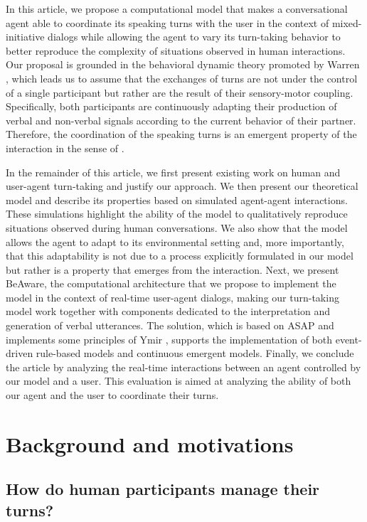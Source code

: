 \documentclass[twocolumn]{svjour3}
\begin{document}
In this article, we propose a computational model that makes a conversational agent able to coordinate its speaking turns with the user in the context of mixed-initiative dialogs while allowing the agent to vary its turn-taking behavior to better reproduce the complexity of situations observed in human interactions. 
Our proposal is grounded in the behavioral dynamic theory promoted by Warren \cite{warren_dynamics_2006}, which leads us to assume that the exchanges of turns are not under the control of a single participant but rather are the result of their sensory-motor coupling. Specifically, both participants are continuously adapting their production of verbal and non-verbal signals according to the current behavior of their partner. Therefore, the coordination of the speaking turns is an emergent property of the interaction in the sense of \cite{warren_dynamics_2006}. 

In the remainder of this article, we first present existing work on human and user-agent turn-taking and justify our approach. 
We then present our theoretical model and describe its properties based on simulated agent-agent interactions. These simulations highlight the ability of the model to qualitatively reproduce situations observed during human conversations. 
We also show that the model allows the agent to adapt to its environmental setting and, more importantly, that this adaptability is not due to a process explicitly formulated in our model but rather is a property that emerges from the interaction. 
Next, we present BeAware, the computational architecture that we propose to implement the model in the context of real-time user-agent dialogs, making our turn-taking model work together with components dedicated to the interpretation and generation of verbal utterances. The solution, which is based on ASAP \cite{kopp_architecture_2014} and implements some principles of Ymir \cite{thorisson_mind_1999}, supports the implementation of both event-driven rule-based models and continuous emergent models. 
Finally, we conclude the article by analyzing the real-time interactions between an agent controlled by our model and a user. 
 This evaluation is aimed at analyzing the ability of both our agent and the user to coordinate their turns. 

\section{Background and motivations}
\label{backgd}

\subsection{How do human participants manage their turns?}
\label{social_psychology}
\end{document}
